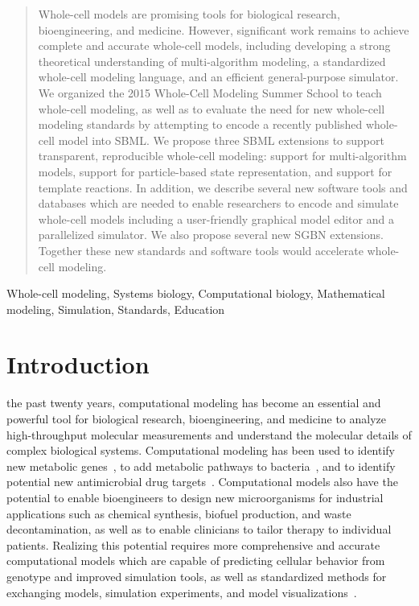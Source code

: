 \documentclass[journal,transmag]{IEEEtran}
\begin{document}
\begin{abstract}
Whole-cell models are promising tools for biological research, bioengineering, and medicine. 
However, significant work remains to achieve complete and accurate whole-cell models, including developing a strong theoretical understanding of multi-algorithm modeling, a standardized whole-cell modeling language, and an efficient general-purpose simulator.
We organized the 2015 Whole-Cell Modeling Summer School to teach whole-cell modeling, as well as to evaluate the need for new whole-cell modeling standards by attempting to encode a recently published whole-cell model into SBML.
We propose three SBML extensions to support transparent, reproducible whole-cell modeling: support for multi-algorithm models, support for particle-based state representation, and support for template reactions. In addition, we describe several new software tools and databases which are needed to enable researchers to encode and simulate whole-cell models including a user-friendly graphical model editor and a parallelized simulator. We also propose several new SGBN extensions.
Together these new standards and software tools would accelerate whole-cell modeling.
\end{abstract}

\begin{IEEEkeywords}
Whole-cell modeling, Systems biology, Computational biology, Mathematical modeling, Simulation, Standards, Education
\end{IEEEkeywords}

\IEEEpeerreviewmaketitle

\section{Introduction}

 the past twenty years, computational modeling has become an essential and powerful tool for biological research, bioengineering, and medicine to analyze high-throughput molecular measurements and understand the molecular details of complex biological systems. Computational modeling has  been used to identify new metabolic genes~\cite{Reed2006}, to add metabolic pathways to bacteria~\cite{Lee2012}, and to identify potential new antimicrobial drug targets~\cite{Lee2009}.
Computational models also have the potential to enable bioengineers to design new microorganisms for industrial applications such as chemical synthesis, biofuel production, and waste decontamination, as well as to enable clinicians to tailor therapy to individual patients. Realizing this potential requires more comprehensive and accurate computational models which are capable of predicting cellular behavior from genotype and improved simulation tools, as well as standardized methods for exchanging models, simulation experiments, and model visualizations~\cite{Macklin2014,Karr2015,Karr2015b,hucka2015promoting,Klipp07}.
\end{document}
